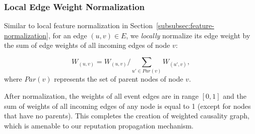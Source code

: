 \subsubsection{Local Edge Weight Normalization}
\label{subsubsec:edge-normalization}

Similar to local feature normalization in Section~\ref{subsubsec:feature-normalization}, for an edge $(u, v)\in E$, we \emph{locally} normalize its edge weight by the sum of edge weights of all incoming edges of node $v$: 

\begin{equation}
    \label{eq:local-feature-normalization}
    W_{(u, v)} = W_{(u, v)}/\sum_{u' \in Par(v)} W_{(u', v)},
\end{equation}
where $Par(v)$ represents the set of parent nodes of node $v$.

After normalization, the weights of all event edges are in range $[0, 1]$ and the sum of weights of all incoming edges of any node is equal to 1 (except for nodes that have no parents). This completes the creation of weighted causality graph, which is amenable to our reputation propagation mechanism.

